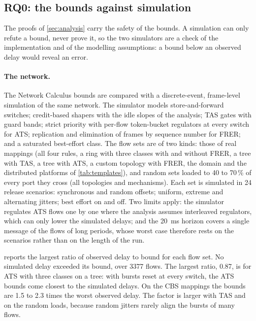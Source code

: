 \subsection{RQ0: the bounds against simulation}
\label{sec:validation}

The proofs of \cref{sec:analysis} carry the safety of the bounds. A
simulation can only refute a bound, never prove it, so the two simulators
are a check of the implementation and of the modelling assumptions: a
bound below an observed delay would reveal an error.

\paragraph{The network.} The Network Calculus bounds are compared with a discrete-event,
frame-level simulation of the same network. The simulator models
store-and-forward switches; credit-based shapers with the idle slopes of
the analysis; TAS gates with guard bands; strict priority with per-flow
token-bucket regulators at every switch for ATS; replication and
elimination of frames by sequence number for FRER; and a saturated
best-effort class. The flow sets are of two kinds: those of real mappings
(all four rules, a ring with three classes with and without FRER, a tree
with TAS, a tree with ATS, a custom topology with FRER, the domain and the
distributed platforms of \cref{tab:templates}), and random sets loaded to
40 to 70\,\% of every port they cross (all topologies and mechanisms). Each set is simulated in
24 release scenarios: synchronous and random offsets; uniform, extreme and
alternating jitters; best effort on and off. Two limits apply: the
simulator regulates ATS flows one by one where the analysis assumes
interleaved regulators, which can only lower the simulated delays; and
the \SI{20}{ms} horizon covers a single message of the flows of long
periods, whose worst case therefore rests on the scenarios rather than on
the length of the run.

 reports the largest ratio of observed delay to bound
for each flow set. No simulated delay exceeded its bound, over 3377 flows. The
largest ratio, 0.87, is for ATS with three classes on a tree: with bursts
reset at every switch, the ATS bounds come closest to the simulated
delays. On the CBS mappings
the bounds are 1.5 to 2.3 times the worst observed delay. The factor is
larger with TAS and on the random loads, because random jitters rarely
align the bursts of many flows.

